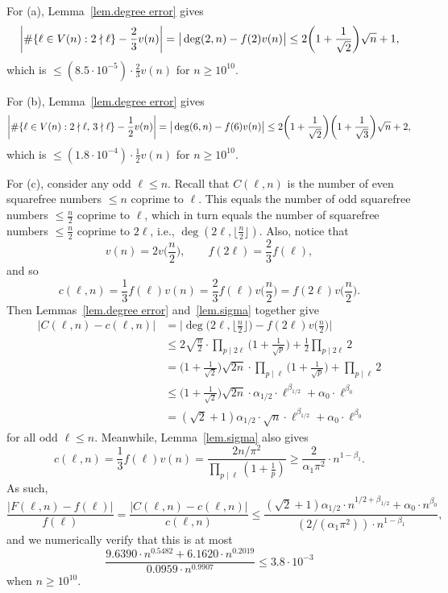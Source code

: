 \documentclass{article}
\theoremstyle{plain}
\theoremstyle{definition}
\theoremstyle{remark}
\begin{document}
For (a), Lemma~\ref{lem.degree error} gives
\[
\bigg|\#\{\ell\in V(n):2\nmid\ell\}-\frac{2}{3}v(n)\bigg|
=\big|\operatorname{deg}(2,n)-f(2)v(n)\big|\\
\leq2\bigg(1+\frac{1}{\sqrt{2}}\bigg)\sqrt{n}+1,
\]
which is $\leq (8.5\cdot 10^{-5})\cdot\frac{2}{3}v(n)$ for $n\geq10^{10}$.

For (b), Lemma~\ref{lem.degree error} gives
\[
\bigg|\#\{\ell\in V(n):2\nmid\ell,\,3\nmid\ell\}-\frac{1}{2}v(n)\bigg|
=\big|\operatorname{deg}(6,n)-f(6)v(n)\big|\\
\leq2\bigg(1+\frac{1}{\sqrt{2}}\bigg)\bigg(1+\frac{1}{\sqrt{3}}\bigg)\sqrt{n}+2,
\]
which is $\leq (1.8\cdot 10^{-4})\cdot\frac{1}{2}v(n)$ for $n\geq10^{10}$.


For (c), consider any odd $\ell\leq n$.
Recall that $C(\ell,n)$ is the number of even squarefree numbers $\leq n$ coprime to $\ell$.
This equals the number of odd squarefree numbers $\leq\frac{n}{2}$ coprime to $\ell$, which in turn equals the number of squarefree numbers $\leq\frac{n}{2}$ coprime to $2\ell$, i.e., $\operatorname{deg}(2\ell,\lfloor\frac{n}{2}\rfloor)$.
Also, notice that
\[
v(n)
=2v\bigg(\frac{n}{2}\bigg),
\qquad
f(2\ell)
=\frac{2}{3}f(\ell),
\]
and so
\[
c(\ell,n)
=\frac{1}{3}f(\ell)v(n)
=\frac{2}{3}f(\ell)v\bigg(\frac{n}{2}\bigg)
=f(2\ell)v\bigg(\frac{n}{2}\bigg).
\]
Then Lemmas~\ref{lem.degree error} and~\ref{lem.sigma} together give
\begin{align*}
\big|C(\ell,n)-c(\ell,n)\big|
&=\bigg|\operatorname{deg}\bigg(2\ell,\bigg\lfloor\frac{n}{2}\bigg\rfloor\bigg)-f(2\ell)v\bigg(\frac{n}{2}\bigg)\bigg|\\
&\leq2\sqrt{\frac{n}{2}}\cdot\prod_{p\mid2\ell}\bigg(1+\frac{1}{\sqrt{p}}\bigg)+\frac{1}{2}\prod_{p\mid2\ell}2\\
&=\bigg(1+\frac{1}{\sqrt{2}}\bigg)\sqrt{2n}\cdot\prod_{p\mid\ell}\bigg(1+\frac{1}{\sqrt{p}}\bigg)+\prod_{p\mid\ell}2\\
&\leq\bigg(1+\frac{1}{\sqrt{2}}\bigg)\sqrt{2n}\cdot \alpha_{1/2}\cdot\ell^{\beta_{1/2}}+\alpha_{0}\cdot\ell^{\beta_{0}}\\
&=(\sqrt{2}+1)\alpha_{1/2}\cdot \sqrt{n}\cdot \ell^{\beta_{1/2}}+\alpha_{0}\cdot \ell^{\beta_{0}}
\end{align*}
for all odd $\ell\leq n$.
Meanwhile, Lemma~\ref{lem.sigma} also gives
\[
c(\ell,n)
=\frac{1}{3}f(\ell)v(n)
=\frac{2n/\pi^2}{\prod_{p\mid\ell}(1+\frac{1}{p})}
\geq \frac{2}{\alpha_1\pi^2}\cdot n^{1-\beta_{1}}.
\]
As such, 
\[
\frac{|F(\ell,n)-f(\ell)|}{f(\ell)}
=\frac{|C(\ell,n)-c(\ell,n)|}{c(\ell,n)}
\leq \frac{(\sqrt{2}+1)\alpha_{1/2}\cdot n^{1/2+\beta_{1/2}}+\alpha_{0}\cdot n^{\beta_{0}}}{(2/(\alpha_1\pi^2))\cdot n^{1-\beta_{1}}},
\]
and we numerically verify that this is at most
\[
\frac{9.6390\cdot n^{0.5482}+6.1620\cdot n^{0.2019}}{0.0959\cdot n^{0.9907}} \leq3.8\cdot10^{-3}
\]
when $n\geq10^{10}$.
\end{document}
